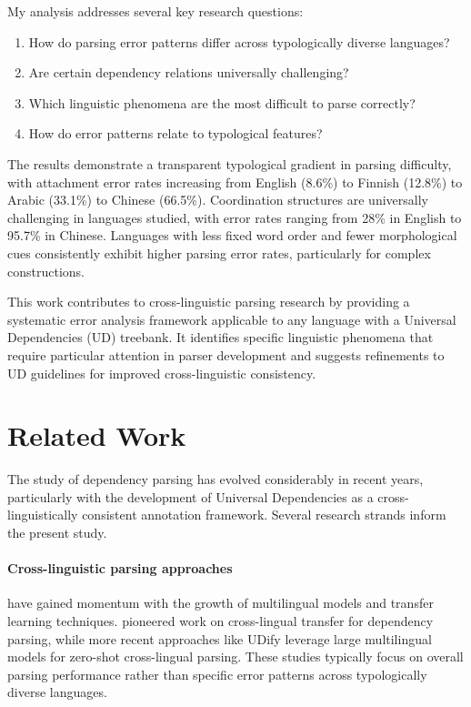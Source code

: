 \documentclass[11pt]{article}
\begin{document}
My analysis addresses several key research questions: 
\begin{enumerate}
\item How do parsing error patterns differ across typologically diverse languages? 
\item Are certain dependency relations universally challenging? 
\item Which linguistic phenomena are the most difficult to parse correctly? 
\item How do error patterns relate to typological features?
\end{enumerate}

The results demonstrate a transparent typological gradient in parsing difficulty, with attachment error rates increasing from English (8.6\%) to Finnish (12.8\%) to Arabic (33.1\%) to Chinese (66.5\%). Coordination structures are universally challenging in languages studied, with error rates ranging from 28\% in English to 95.7\% in Chinese. Languages with less fixed word order and fewer morphological cues consistently exhibit higher parsing error rates, particularly for complex constructions.

This work contributes to cross-linguistic parsing research by providing a systematic error analysis framework applicable to any language with a Universal Dependencies (UD) treebank. It identifies specific linguistic phenomena that require particular attention in parser development and suggests refinements to UD guidelines for improved cross-linguistic consistency.

\section{Related Work}

The study of dependency parsing has evolved considerably in recent years, particularly with the development of Universal Dependencies as a cross-linguistically consistent annotation framework. Several research strands inform the present study.

\paragraph{Cross-linguistic parsing approaches} have gained momentum with the growth of multilingual models and transfer learning techniques. \citet{mcdonald-etal-2011-multi} pioneered work on cross-lingual transfer for dependency parsing, while more recent approaches like UDify \citep{kondratyuk-straka-2019-75} leverage large multilingual models for zero-shot cross-lingual parsing. These studies typically focus on overall parsing performance rather than specific error patterns across typologically diverse languages.
\end{document}

